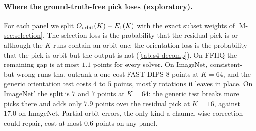 \paragraph{Where the ground-truth-free pick loses (exploratory).}
For each panel we split $O_{\mathrm{orbit}}(K)-E_1(K)$ with the exact subset weights of \cref{M-sec:selection}.
The selection loss is the probability that the residual pick is \cons or \incons although the $K$ runs contain an orbit-\good one; the orientation loss is the probability that the pick is orbit-\good but the output is not \good (\cref{tab:s4-decomp}).
On FFHQ the remaining gap is at most $1.1$ points for every solver.
On ImageNet, consistent-but-wrong runs that outrank a \good one cost FAST-DIPS $8$ points at $K=64$, and the generic orientation test costs $4$ to $5$ points, mostly rotations it leaves in place.
On ImageNet$'$ the split is $7$ and $7$ points at $K=64$: the generic test breaks more \good picks there and adds only $7.9$ points over the residual pick at $K=16$, against $17.0$ on ImageNet.
Partial orbit errors, the only kind a channel-wise correction could repair, cost at most $0.6$ points on any panel.

\begin{table}[h]
\centering\small
\setlength{\tabcolsep}{4pt}
\caption{\textbf{Decomposition of the gap between $\Eone$ and the orbit oracle} (exploratory; points). ``Pick orbit-\good'': the residual pick is \good or an orbit error. Columns 6--10 sum to $\Oorb-\Eone$ up to rounding.}
\label{tab:s4-decomp}
\end{table}

